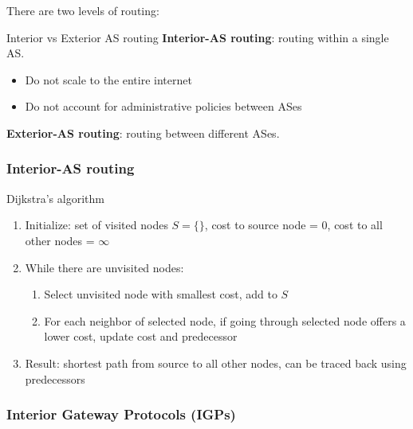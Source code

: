 
There are two levels of routing:

\begin{knBox}
    {Interior vs Exterior AS routing}
    \textbf{Interior-AS routing}: routing within a single AS.
    \begin{itemize}
        \item Do not scale to the entire internet
        \item Do not account for administrative policies between ASes
    \end{itemize}
    \textbf{Exterior-AS routing}: routing between different ASes.
\end{knBox}

\subsubsection{Interior-AS routing}

\begin{knBox}
    {Dijkstra's algorithm}
    \begin{enumerate}
        \item Initialize: set of visited nodes $S=\{\}$, cost to source node = 0, cost to all other nodes = $\infty$
        \item While there are unvisited nodes:
              \begin{enumerate}
                  \item Select unvisited node with smallest cost, add to $S$
                  \item For each neighbor of selected node, if going through selected node offers a lower cost, update cost and predecessor
              \end{enumerate}
        \item Result: shortest path from source to all other nodes, can be traced back using predecessors
    \end{enumerate}
\end{knBox}

\subsubsection{Interior Gateway Protocols (IGPs)}

